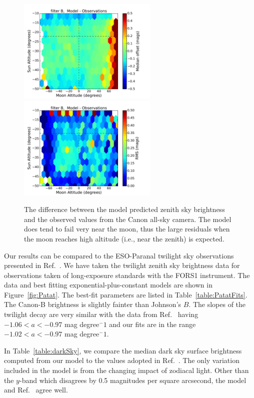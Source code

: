 \documentclass[]{spie}
\begin{document}
\begin{figure}[ht]
\begin{center}
  \includegraphics[height=5cm]{plots/zenithMedian_B_.pdf}\includegraphics[height=5cm]{plots/zenithRMS_B_.pdf}
  \end{center}
  \caption{ The difference between the model predicted zenith sky brightness and the observed values from the Canon all-sky camera.  The model does tend to fail very near the moon, thus the large residuals when the moon reaches high altitude (i.e., near the zenith) is expected.  \label{fig:zenithModel}}
\end{figure}


Our results can be compared to the ESO-Paranal twilight sky observations presented in Ref.~. We have taken the twilight zenith sky brightness data for observations taken of long-exposure standards with the FORS1 instrument.  The data and best fitting exponential-plus-constant models are shown in Figure~\ref{fig:Patat}.  The best-fit parameters are listed in Table~\ref{table:PatatFits}.  The Canon-B brightness is slightly fainter than Johnson's $B$.  The slopes of the twilight decay are very similar with the data from Ref.~ having $ -1.06  < a < -0.97 $ mag degree$^-1$ and our fits are in the range $ -1.02 < a < -0.97$ mag degree$^-1$.


In Table~\ref{table:darkSky}, we compare the median dark sky surface brightness computed from our model to the values adopted in Ref.~.  The only variation included in the model is from the changing impact of zodiacal light.  Other than the $y$-band which disagrees by 0.5 magnitudes per square arcsecond, the model and Ref.~ agree well. 
\end{document}
